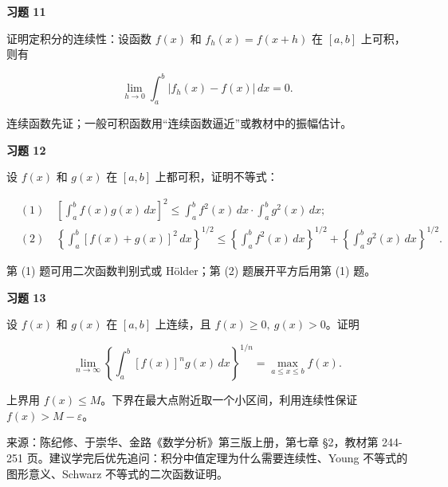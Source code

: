 \begin{exercisebox}
\textbf{习题 11 }

证明定积分的连续性：设函数 \(f(x)\) 和 \(f_h(x)=f(x+h)\) 在 \([a,b]\) 上可积，则有

\[
        \lim_{h\to0}\int_a^b |f_h(x)-f(x)|\,dx=0.
      \]

\begin{hintbox}
连续函数先证；一般可积函数用“连续函数逼近”或教材中的振幅估计。
\end{hintbox}
\end{exercisebox}

\begin{exercisebox}
\textbf{习题 12 }

设 \(f(x)\) 和 \(g(x)\) 在 \([a,b]\) 上都可积，证明不等式：

\[
      \begin{aligned}
      &(1)\quad
      \left[\int_a^b f(x)g(x)\,dx\right]^2
      \le
      \int_a^b f^2(x)\,dx\cdot\int_a^b g^2(x)\,dx;\\
      &(2)\quad
      \left\{\int_a^b [f(x)+g(x)]^2\,dx\right\}^{1/2}
      \le
      \left\{\int_a^b f^2(x)\,dx\right\}^{1/2}
      +
      \left\{\int_a^b g^2(x)\,dx\right\}^{1/2}.
      \end{aligned}
      \]

\begin{hintbox}
第 (1) 题可用二次函数判别式或 Hölder；第 (2) 题展开平方后用第 (1) 题。
\end{hintbox}
\end{exercisebox}

\begin{exercisebox}
\textbf{习题 13 }

设 \(f(x)\) 和 \(g(x)\) 在 \([a,b]\) 上连续，且 \(f(x)\ge0,\ g(x)>0\)。证明

\[
        \lim_{n\to\infty}
        \left\{\int_a^b [f(x)]^n g(x)\,dx\right\}^{1/n}
        =
        \max_{a\le x\le b} f(x).
      \]

\begin{hintbox}
上界用 \(f(x)\le M\)。下界在最大点附近取一个小区间，利用连续性保证 \(f(x)>M-\varepsilon\)。
\end{hintbox}
\end{exercisebox}

来源：陈纪修、于崇华、金路《数学分析》第三版上册，第七章 §2，教材第 244-251 页。建议学完后优先追问：积分中值定理为什么需要连续性、Young 不等式的图形意义、Schwarz 不等式的二次函数证明。

